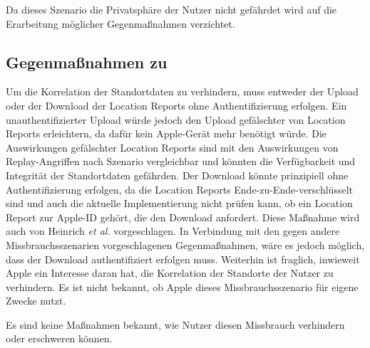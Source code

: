 Da dieses Szenario die Privatsphäre der Nutzer nicht gefährdet wird auf die Erarbeitung möglicher Gegenmaßnahmen verzichtet.

\subsection{Gegenmaßnahmen zu }
Um die Korrelation der Standortdaten zu verhindern, muss entweder der Upload oder der Download der Location Reports ohne Authentifizierung erfolgen.
Ein unauthentifizierter Upload würde jedoch den Upload gefälschter von Location Reports erleichtern, da dafür kein Apple-Gerät mehr benötigt würde.
Die Auswirkungen gefälschter Location Reports sind mit den Auswirkungen von Replay-Angriffen nach Szenario  vergleichbar und könnten die Verfügbarkeit und Integrität der Standortdaten gefährden.
Der Download könnte prinzipiell ohne Authentifizierung erfolgen, da die Location Reports Ende-zu-Ende-verschlüsselt sind und auch die aktuelle Implementierung nicht prüfen kann, ob ein Location Report zur Apple-ID gehört, die den Download anfordert.
Diese Maßnahme wird auch von Heinrich \textit{et al.} \cite{Heinrich_FindMy} vorgeschlagen.
In Verbindung mit den gegen andere Missbrauchsszenarien vorgeschlagenen Gegenmaßnahmen, wäre es jedoch möglich, dass der Download authentifiziert erfolgen muss.
Weiterhin ist fraglich, inwieweit Apple ein Interesse daran hat, die Korrelation der Standorte der Nutzer zu verhindern.
Es ist nicht bekannt, ob Apple dieses Missbrauchsszenario für eigene Zwecke nutzt.

Es sind keine Maßnahmen bekannt, wie Nutzer diesen Missbrauch verhindern oder erschweren können.
